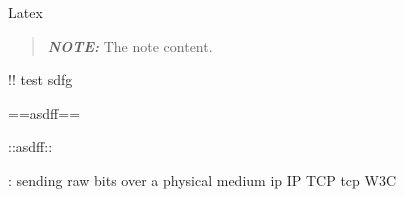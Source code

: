 \begin{frame}[fragile]{Latex}
\begin{quote}
\textbf{\emph{NOTE:}} The note content.
\end{quote}

!! test sdfg

==asdff==

::asdff::

\begin{Shaded}
\begin{Highlighting}[]
\end{Highlighting}
\end{Shaded}

: sending raw bits over a physical medium ip IP TCP tcp W3C
\end{frame}
